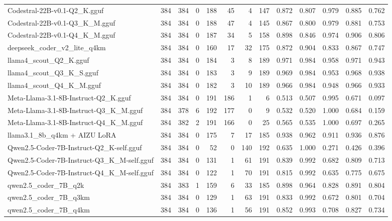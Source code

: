 \begin{table}[htbp]
{\begin{tabular}{lrrrrrrrrrrrr}
    Codestral-22B-v0.1-Q2\_K.gguf & 384 & 384 & 0 & 188 & 45 & 4 & 147 & 0.872 & 0.807 & 0.979 & 0.885 & 0.762 \\
    Codestral-22B-v0.1-Q3\_K\_M.gguf & 384 & 384 & 0 & 188 & 47 & 4 & 145 & 0.867 & 0.800 & 0.979 & 0.881 & 0.753 \\
    Codestral-22B-v0.1-Q4\_K\_M.gguf & 384 & 384 & 0 & 187 & 34 & 5 & 158 & 0.898 & 0.846 & 0.974 & 0.906 & 0.806 \\
    deepseek\_coder\_v2\_lite\_q4km & 384 & 384 & 0 & 160 & 17 & 32 & 175 & 0.872 & 0.904 & 0.833 & 0.867 & 0.747 \\
    llama4\_scout\_Q2\_K.gguf & 384 & 384 & 0 & 184 & 3 & 8 & 189 & 0.971 & 0.984 & 0.958 & 0.971 & \cellcolor{green!10}0.943 \\
    llama4\_scout\_Q3\_K\_S.gguf & 384 & 384 & 0 & 183 & 3 & 9 & 189 & 0.969 & 0.984 & 0.953 & 0.968 & 0.938 \\
    llama4\_scout\_Q4\_K\_M.gguf & 384 & 384 & 0 & 182 & 3 & 10 & 189 & 0.966 & 0.984 & 0.948 & 0.966 & 0.933 \\
    Meta-Llama-3.1-8B-Instruct-Q2\_K.gguf & 384 & 384 & 0 & 191 & 186 & 1 & 6 & 0.513 & 0.507 & 0.995 & 0.671 & 0.097 \\
    Meta-Llama-3.1-8B-Instruct-Q3\_K\_M.gguf & 384 & 378 & 6 & 192 & 177 & 0 & 9 & 0.532 & 0.520 & 1.000 & 0.684 & 0.159 \\
    Meta-Llama-3.1-8B-Instruct-Q4\_K\_M.gguf & 384 & 382 & 2 & 191 & 166 & 0 & 25 & 0.565 & 0.535 & 1.000 & 0.697 & 0.265 \\
    llama3.1\_8b\_q4km + AIZU LoRA & 384 & 384 & 0 & 175 & 7 & 17 & 185 & 0.938 & 0.962 & 0.911 & 0.936 & 0.876 \\
    Qwen2.5-Coder-7B-Instruct-Q2\_K-self.gguf & 384 & 384 & 0 & 52 & 0 & 140 & 192 & 0.635 & 1.000 & 0.271 & 0.426 & 0.396 \\
    Qwen2.5-Coder-7B-Instruct-Q3\_K\_M-self.gguf & 384 & 384 & 0 & 131 & 1 & 61 & 191 & 0.839 & 0.992 & 0.682 & 0.809 & 0.713 \\
    Qwen2.5-Coder-7B-Instruct-Q4\_K\_M-self.gguf & 384 & 384 & 0 & 122 & 1 & 70 & 191 & 0.815 & 0.992 & 0.635 & 0.775 & 0.675 \\
    qwen2.5\_coder\_7B\_q2k & 384 & 383 & 1 & 159 & 6 & 33 & 185 & 0.898 & 0.964 & 0.828 & 0.891 & 0.804 \\
    qwen2.5\_coder\_7B\_q3km & 384 & 384 & 0 & 129 & 1 & 63 & 191 & 0.833 & 0.992 & 0.672 & 0.801 & 0.704 \\
    qwen2.5\_coder\_7B\_q4km & 384 & 384 & 0 & 136 & 1 & 56 & 191 & 0.852 & 0.993 & 0.708 & 0.827 & 0.734 \\

\end{tabular}}
\end{table}
